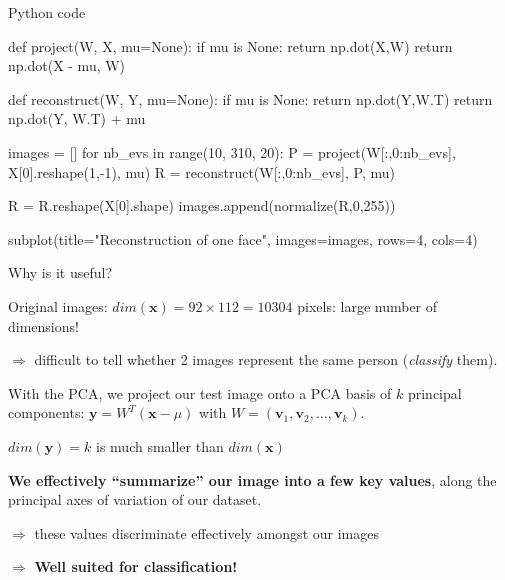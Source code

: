 \documentclass[compress]{beamer}
\begin{document}
\begin{frame}[fragile]{Python code}

\begin{pythoncode}
def project(W, X, mu=None):
    if mu is None:
        return np.dot(X,W)
    return np.dot(X - mu, W)

def reconstruct(W, Y, mu=None):
    if mu is None:
        return np.dot(Y,W.T)
    return np.dot(Y, W.T) + mu

images = []
for nb_evs in range(10, 310, 20):
    P = project(W[:,0:nb_evs], X[0].reshape(1,-1), mu)
    R = reconstruct(W[:,0:nb_evs], P, mu)

    R = R.reshape(X[0].shape)
    images.append(normalize(R,0,255))

subplot(title="Reconstruction of one face", images=images, rows=4, cols=4)
\end{pythoncode}
\end{frame}


\begin{frame}{Why is it useful?}


    Original images: $dim(\mathbf{x}) = 92 \times 112 = 10304$ pixels: large number of dimensions!

    $\Rightarrow$ difficult to tell whether 2 images represent the same person
    (\ie \emph{classify} them).

    \pause

    With the PCA, we project our test image onto a PCA basis of $k$ principal
    components: $\mathbf{y} = W^{T} (\mathbf{x} - \mu)$ with $W = (\mathbf{v}_{1}, \mathbf{v}_{2}, \ldots, \mathbf{v}_{k})$.


    $dim(\mathbf{y}) = k$ is much smaller than $dim(\mathbf{x})$

    \pause

    \textbf{We effectively ``summarize'' our image into a few key values}, along
    the principal axes of variation of our dataset.

    $\Rightarrow$ these values discriminate effectively amongst our images
    
    $\Rightarrow$ \textbf{Well suited for classification!}

\end{frame}

\end{document}
